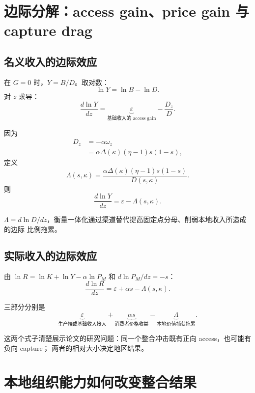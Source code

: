 \documentclass[UTF8,11pt,scheme=chinese,fontset=fandol]{ctexart}
\theoremstyle{definition}
\begin{document}
\section{边际分解：access gain、price gain 与 capture drag}

\subsection{名义收入的边际效应}

在 \(G=0\) 时，\(Y=B/D\)。取对数：
\[
\ln Y=\ln B-\ln D.
\]
对 \(z\) 求导：
\begin{equation}
\frac{d\ln Y}{dz}
=\underbrace{\varepsilon}_{\text{基础收入的 access gain}}
-\frac{D_z}{D}.
\end{equation}

因为
\begin{align}
D_z&=-\alpha\omega_z\\
&=\alpha\Delta(\kappa)(\eta-1)s(1-s),
\end{align}
定义
\begin{equation}
\boxed{
\Lambda(s,\kappa)
=\frac{\alpha\Delta(\kappa)(\eta-1)s(1-s)}{D(s,\kappa)}.}
\label{teach:eq:Lambda}
\end{equation}
则
\begin{equation}
\frac{d\ln Y}{dz}=\varepsilon-\Lambda(s,\kappa).
\label{teach:eq:marginal-Y}
\end{equation}

\(\Lambda=d\ln D/dz\)，衡量一体化通过渠道替代提高固定点分母、削弱本地收入所造成的边际
比例拖累。

\subsection{实际收入的边际效应}

由 \(\ln R=\ln K+\ln Y-\alpha\ln P_M\) 和
\(d\ln P_M/dz=-s\)：
\begin{equation}
\frac{d\ln R}{dz}
=\varepsilon+\alpha s-\Lambda(s,\kappa).
\label{teach:eq:marginal-R}
\end{equation}

三部分分别是
\[
\underbrace{\varepsilon}_{\text{生产端或基础收入接入}}
+\underbrace{\alpha s}_{\text{消费者价格收益}}
-\underbrace{\Lambda}_{\text{本地价值捕获拖累}}.
\]

这两个式子清楚展示论文的研究问题：同一个整合冲击既有正向 access，也可能有负向 capture；
两者的相对大小决定地区结果。

\section{本地组织能力如何改变整合结果}
\end{document}
